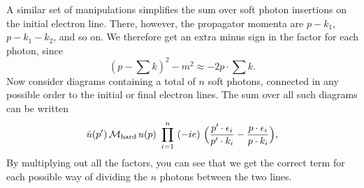 A similar set of manipulations simplifies the sum over soft photon insertions
on the initial electron line.  There, however, the propagator momenta are
$p-k_1$, $p-k_1-k_2$, and so on.  We therefore get an extra minus sign in the
factor for each photon, since
\begin{equation}
  (p-\textstyle\sum k)^2 - m^2 \approx -2p\cdot\textstyle\sum k .
\end{equation}
Now consider diagrams containing a total of $n$ soft photons, connected in any
possible order to the initial or final electron lines.  The sum over all such
diagrams can be written
\begin{equation}
  \bar{u}(p')\,\mathcal{M}_{\mathrm{hard}}\,u(p)\ \prod_{i=1}^{n}\ (-ie)\
    \Bigl( \frac{p'\cdot\epsilon_i}{p'\cdot k_i} - \frac{p\cdot\epsilon_i}
      {p\cdot k_i} \Bigr),
  \label{eq:6.77}
\end{equation}
By multiplying out all the factors, you can see that we get the correct term
for each possible way of dividing the $n$ photons between the two lines.

